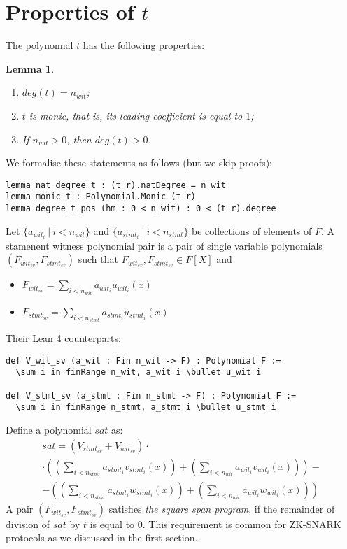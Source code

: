 \documentclass{article}
\newtheorem{lemma}{Lemma}
\theoremstyle{definition}
\theoremstyle{remark}
\begin{document}
\section{Properties of $t$}

The polynomial $t$ has the following properties:

\begin{lemma}
$ $

\begin{enumerate}
\item $deg(t) = n_{wit}$;
\item $t$ is monic, that is, its leading coefficient is equal to $1$;
\item If $n_{wit} > 0$, then $deg(t) > 0$.
\end{enumerate}
\end{lemma}

We formalise these statements as follows (but we skip proofs):
\begin{lstlisting}
lemma nat_degree_t : (t r).natDegree = n_wit
lemma monic_t : Polynomial.Monic (t r)
lemma degree_t_pos (hm : 0 < n_wit) : 0 < (t r).degree
\end{lstlisting}

Let $\{ a_{{wit}_i} \: | \: i < n_{wit}\}$ and $\{ a_{{stmt}_i} \: | \: i < n_{stmt} \}$ be collections of elements of $F$. A stamenent witness polynomial pair is a pair of single variable polynomials $(F_{{wit}_{sv}}, F_{{stmt}_{sv}})$
such that $F_{{wit}_{sv}}, F_{{stmt}_{sv}} \in F[X]$ and
\begin{itemize}
\item $F_{{wit}_{sv}} = \sum \limits_{i < n_{wit}} a_{{wit}_i} u_{{wit}_{i}}(x)$
\item $F_{{stmt}_{sv}} = \sum \limits_{i < n_{stmt}} a_{{stmt}_i} u_{{stmt}_{i}}(x)$
\end{itemize}

Their Lean 4 counterparts:
\begin{lstlisting}
def V_wit_sv (a_wit : Fin n_wit -> F) : Polynomial F :=
  \sum i in finRange n_wit, a_wit i \bullet u_wit i

def V_stmt_sv (a_stmt : Fin n_stmt -> F) : Polynomial F :=
  \sum i in finRange n_stmt, a_stmt i \bullet u_stmt i
\end{lstlisting}


Define a polynomial $sat$ as:
\begin{multline}
sat = (V_{{stmt}_{sv}} + V_{{wit}_{sv}}) \cdot \\ \cdot ((\sum \limits_{i < n_{stmt}} a_{{stmt}_i} v_{{stmt}_i}(x)) + (\sum \limits_{i < n_{wit}} a_{{wit}_i} v_{{wit}_i}(x) )) - \\ - ((\sum \limits_{i < n_{stmt}} a_{{stmt}_i} w_{{stmt}_i}(x)) + (\sum \limits_{i < n_{wit}} a_{{wit}_i} w_{{wit}_i}(x) ))
\end{multline}
A pair $(F_{{wit}_{sv}}, F_{{stmt}_{sv}})$ satisfies \emph{the square span program}, if the remainder of division of $sat$ by $t$ is equal to $0$. This requirement is common for ZK-SNARK protocols as we discussed in the first section.
\end{document}
